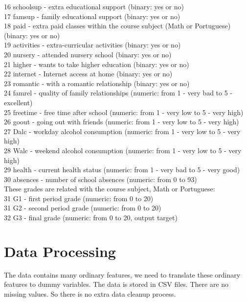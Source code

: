 \documentclass{article}
\begin{document}
16 schoolsup - extra educational support (binary: yes or no) \\
17 famsup - family educational support (binary: yes or no) \\
18 paid - extra paid classes within the course subject (Math or Portuguese) (binary: yes or no) \\
19 activities - extra-curricular activities (binary: yes or no) \\
20 nursery - attended nursery school (binary: yes or no) \\
21 higher - wants to take higher education (binary: yes or no) \\
22 internet - Internet access at home (binary: yes or no) \\
23 romantic - with a romantic relationship (binary: yes or no) \\
24 famrel - quality of family relationships (numeric: from 1 - very bad to 5 - excellent) \\
25 freetime - free time after school (numeric: from 1 - very low to 5 - very high) \\
26 goout - going out with friends (numeric: from 1 - very low to 5 - very high) \\
27 Dalc - workday alcohol consumption (numeric: from 1 - very low to 5 - very high) \\
28 Walc - weekend alcohol consumption (numeric: from 1 - very low to 5 - very high) \\
29 health - current health status (numeric: from 1 - very bad to 5 - very good) \\
30 absences - number of school absences (numeric: from 0 to 93) \\
These grades are related with the course subject, Math or Portuguese: \\
31 G1 - first period grade (numeric: from 0 to 20) \\
31 G2 - second period grade (numeric: from 0 to 20) \\
32 G3 - final grade (numeric: from 0 to 20, output target) \\

\section{Data Processing}
The data contains many ordinary features, we need to translate these ordinary features to dummy variables. The data is stored in CSV files. There are no missing values. So there is no extra data cleanup process.
\end{document}
